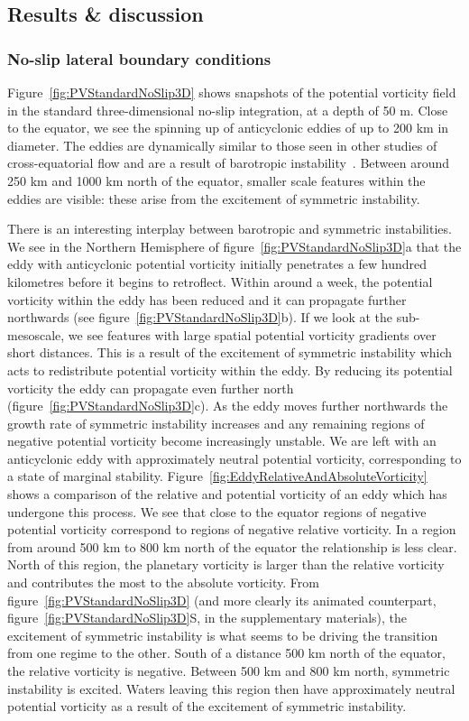 \subsection{Results \& discussion}
\label{subsec:3DResults}
\subsubsection{No-slip lateral boundary conditions}
Figure~\ref{fig:PVStandardNoSlip3D} shows snapshots of the potential vorticity field in the standard three-dimensional no-slip integration, at a depth of 50 m. Close to the equator, we see the spinning up of anticyclonic eddies of up to 200 km in diameter. The eddies are dynamically similar to those seen in other studies of cross-equatorial flow and are a result of barotropic instability~\citep[e.g.][]{Edwards1998I, Edwards1998II, Jochum2003, Goes2009}. Between around 250 km and 1000 km north of the equator, smaller scale features within the eddies are visible: these arise from the excitement of symmetric instability.

There is an interesting interplay between barotropic and symmetric instabilities. We see in the Northern Hemisphere of figure~\ref{fig:PVStandardNoSlip3D}a that the eddy with anticyclonic potential vorticity initially penetrates a few hundred kilometres before it begins to retroflect. Within around a week, the potential vorticity within the eddy has been reduced and it can propagate further northwards (see figure~\ref{fig:PVStandardNoSlip3D}b). If we look at the sub-mesoscale, we see features with large spatial potential vorticity gradients over short distances. This is a result of the excitement of symmetric instability which acts to redistribute potential vorticity within the eddy. By reducing its potential vorticity the eddy can propagate even further north (figure~\ref{fig:PVStandardNoSlip3D}c). As the eddy moves further northwards the growth rate of symmetric instability increases and any remaining regions of negative potential vorticity become increasingly unstable. We are left with an anticyclonic eddy with approximately neutral potential vorticity, corresponding to a state of marginal stability. Figure~\ref{fig:EddyRelativeAndAbsoluteVorticity} shows a comparison of the relative and potential vorticity of an eddy which has undergone this process. We see that close to the equator regions of negative potential vorticity correspond to regions of negative relative vorticity. In a region from around 500 km to 800 km north of the equator the relationship is less clear. North of this region, the planetary vorticity is larger than the relative vorticity and contributes the most to the absolute vorticity. From figure~\ref{fig:PVStandardNoSlip3D} (and more clearly its animated counterpart, figure~\ref{fig:PVStandardNoSlip3D}S, in the supplementary materials), the excitement of symmetric instability is what seems to be driving the transition from one regime to the other. South of a distance 500 km north of the equator, the relative vorticity is negative. Between 500 km and 800 km north, symmetric instability is excited. Waters leaving this region then have approximately neutral potential vorticity as a result of the excitement of symmetric instability.

